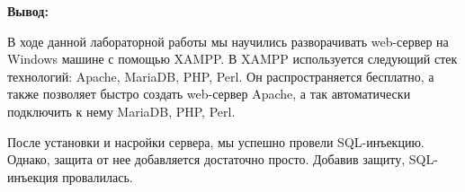 \documentclass[a4paper,14pt]{extarticle}
\begin{document}
    \textbf{Вывод:}

    В ходе данной лабораторной работы мы научились разворачивать web-сервер
    на Windows машине с помощью XAMPP. В XAMPP используется следующий стек 
    технологий: Apache, MariaDB, PHP, Perl. Он распространяется бесплатно, а также
    позволяет быстро создать web-сервер Apache, а так автоматически подключить к 
    нему MariaDB, PHP, Perl. \par 
    После установки и насройки сервера, мы успешно провели SQL-инъекцию. \linebreak
    Однако, защита от нее добавляется достаточно просто. Добавив защиту, SQL-\linebreak
    инъекция провалилась.

    
\end{document}
